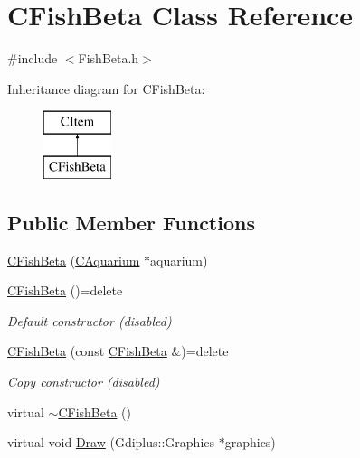 \hypertarget{class_c_fish_beta}{}\section{C\+Fish\+Beta Class Reference}
\label{class_c_fish_beta}


{\ttfamily \#include $<$Fish\+Beta.\+h$>$}

Inheritance diagram for C\+Fish\+Beta\+:\begin{figure}[H]
\begin{center}
\leavevmode
\includegraphics[height=2.000000cm]{class_c_fish_beta}
\end{center}
\end{figure}
\subsection*{Public Member Functions}
\begin{DoxyCompactItemize}
\item 
\mbox{\hyperlink{class_c_fish_beta_a021073e2e0034271cd7e776b1e3fed29}{C\+Fish\+Beta}} (\mbox{\hyperlink{class_c_aquarium}{C\+Aquarium}} $\ast$aquarium)
\item 
\mbox{\label{class_c_fish_beta_a4e4d132618735adad44d04c9c40687ca}} 
\mbox{\hyperlink{class_c_fish_beta_a4e4d132618735adad44d04c9c40687ca}{C\+Fish\+Beta}} ()=delete
\begin{DoxyCompactList}\small\item\em Default constructor (disabled) \end{DoxyCompactList}\item 
\mbox{\label{class_c_fish_beta_adbf3559baac135dff393729c51b1ab31}} 
\mbox{\hyperlink{class_c_fish_beta_adbf3559baac135dff393729c51b1ab31}{C\+Fish\+Beta}} (const \mbox{\hyperlink{class_c_fish_beta}{C\+Fish\+Beta}} \&)=delete
\begin{DoxyCompactList}\small\item\em Copy constructor (disabled) \end{DoxyCompactList}\item 
virtual \mbox{\hyperlink{class_c_fish_beta_abd932894ad25a70f03c79c4f0f00fff4}{$\sim$\+C\+Fish\+Beta}} ()
\item 
virtual void \mbox{\hyperlink{class_c_fish_beta_ae2effbff7b98bb3cd6e1070d61d5366e}{Draw}} (Gdiplus\+::\+Graphics $\ast$graphics)
\end{DoxyCompactItemize}
